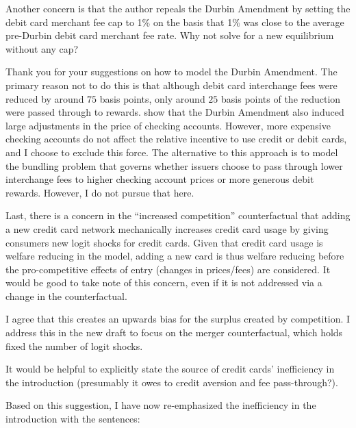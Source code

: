 \documentclass[main.tex]{subfiles}
\begin{document}
\begin{refsection}
\begin{refcommentnoclear}
Another concern is that the author repeals the Durbin Amendment by setting the debit card merchant fee cap to 1\% on the basis that 1\% was close to the average pre-Durbin debit card merchant fee rate.
Why not solve for a new equilibrium without any cap?
\end{refcommentnoclear}

Thank you for your suggestions on how to model the Durbin Amendment.
The primary reason not to do this is that although debit card interchange fees were reduced by around $75$ basis points, only around $25$ basis points of the reduction were passed through to rewards.
\textcite{Mukharlyamov.Sarin2025} show that the Durbin Amendment also induced large adjustments in the price of checking accounts.
However, more expensive checking accounts do not affect the relative incentive to use credit or debit cards, and I choose to exclude this force.
The alternative to this approach is to model the bundling problem that governs whether issuers choose to pass through lower interchange fees to higher checking account prices or more generous debit rewards.
However, I do not pursue that here.

\begin{refcommentnoclear}
Last, there is a concern in the “increased competition” counterfactual that adding a new credit card network mechanically increases credit card usage by giving consumers new logit shocks for credit cards.
Given that credit card usage is welfare reducing in the model, adding a new card is thus welfare reducing before the pro-competitive effects of entry (changes in prices/fees) are considered.
It would be good to take note of this concern, even if it is not addressed via a change in the counterfactual.
\end{refcommentnoclear}

I agree that this creates an upwards bias for the surplus created by competition.
I address this in the new draft to focus on the merger counterfactual, which holds fixed the number of logit shocks.

\begin{refcommentnoclear}
It would be helpful to explicitly state the source of credit cards' inefficiency in the introduction (presumably it owes to credit aversion and fee pass-through?).
\end{refcommentnoclear}

Based on this suggestion, I have now re-emphasized the inefficiency in the introduction with the sentences:


\end{refsection}
\end{document}
